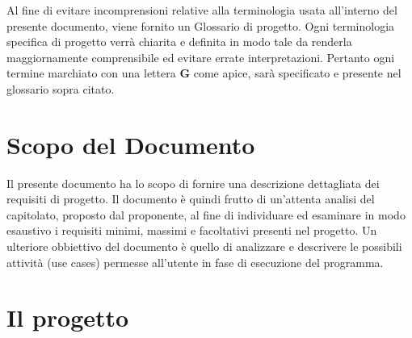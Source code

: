 \begin{beginningnote}
    Al fine di evitare incomprensioni relative alla terminologia usata all’interno del presente documento, viene fornito un Glossario di progetto. Ogni terminologia specifica di progetto verrà chiarita e definita in modo tale da renderla maggiornamente comprensibile ed evitare errate interpretazioni. Pertanto ogni termine marchiato con una lettera \textbf{G} come apice, sarà specificato e presente nel glossario sopra citato.
\end{beginningnote}

\section{Scopo del Documento}\label{sec:scopo_del_documento}
Il presente documento ha lo scopo di fornire una descrizione dettagliata dei requisiti di progetto. Il documento è quindi frutto di un'attenta analisi del capitolato, proposto dal proponente, al fine di individuare ed esaminare in modo esaustivo i requisiti minimi, massimi e facoltativi presenti nel progetto. 
Un ulteriore obbiettivo del documento è quello di analizzare e descrivere le possibili attività (use cases) permesse all'utente in fase di esecuzione del programma. 

\section{Il progetto}\label{sec:progetto}
